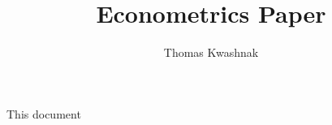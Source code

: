 \documentclass{report}
\title{Econometrics Paper}
\author{Thomas Kwashnak}
\begin{document}
\maketitle

This document
\end{document}
